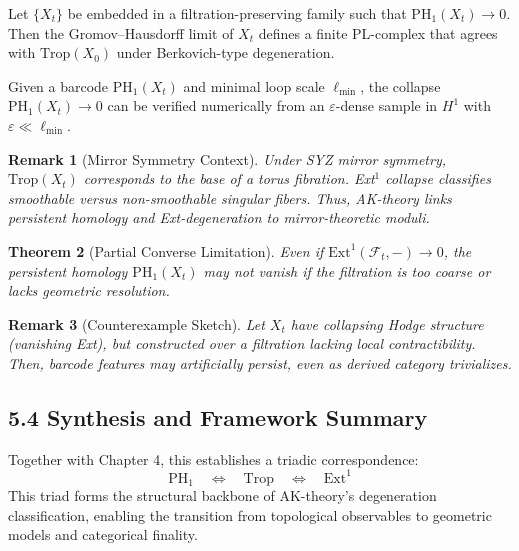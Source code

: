 \documentclass[11pt]{article}
\newtheorem{theorem}{Theorem}[section]
\newtheorem{remark}[theorem]{Remark}
\begin{document}
\begin{lemma}
Let $\{X_t\}$ be embedded in a filtration-preserving family such that $\mathrm{PH}_1(X_t) \to 0$. Then the Gromov--Hausdorff limit of $X_t$ defines a finite PL-complex that agrees with $\mathrm{Trop}(X_0)$ under Berkovich-type degeneration.
\end{lemma}

\begin{proposition}
Given a barcode $\mathrm{PH}_1(X_t)$ and minimal loop scale $\ell_{\min}$, the collapse $\mathrm{PH}_1(X_t) \to 0$ can be verified numerically from an $\varepsilon$-dense sample in $H^1$ with $\varepsilon \ll \ell_{\min}$.
\end{proposition}

\begin{remark}[Mirror Symmetry Context]
Under SYZ mirror symmetry, $\mathrm{Trop}(X_t)$ corresponds to the base of a torus fibration. Ext$^1$ collapse classifies smoothable versus non-smoothable singular fibers. Thus, AK-theory links persistent homology and Ext-degeneration to mirror-theoretic moduli.
\end{remark}

\begin{theorem}[Partial Converse Limitation]
Even if $\mathrm{Ext}^1(\mathcal{F}_t, -) \to 0$, the persistent homology $\mathrm{PH}_1(X_t)$ may not vanish if the filtration is too coarse or lacks geometric resolution.
\end{theorem}

\begin{remark}[Counterexample Sketch]
Let $X_t$ have collapsing Hodge structure (vanishing Ext), but constructed over a filtration lacking local contractibility. Then, barcode features may artificially persist, even as derived category trivializes.
\end{remark}

\subsection{5.4 Synthesis and Framework Summary}

Together with Chapter 4, this establishes a triadic correspondence:
\[
\mathrm{PH}_1 \quad \Longleftrightarrow \quad \mathrm{Trop} \quad \Longleftrightarrow \quad \mathrm{Ext}^1
\]
This triad forms the structural backbone of AK-theory’s degeneration classification, enabling the transition from topological observables to geometric models and categorical finality.
\end{document}
